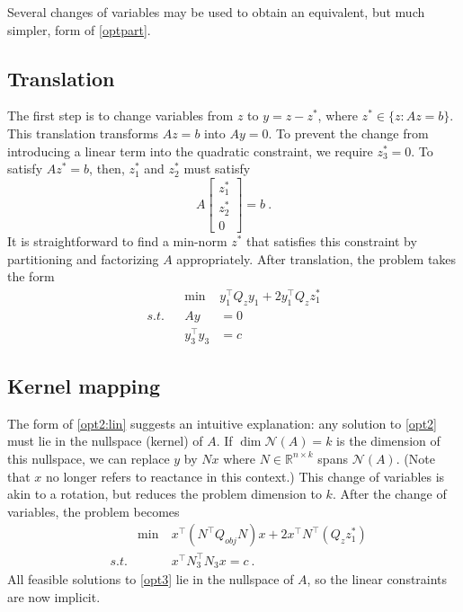 \documentclass[conference]{IEEEtran}
\begin{document}
Several changes of variables may be used to obtain an equivalent, but much simpler, form of \eqref{optpart}.

\subsection{Translation}

The first step is to change variables from $z$ to $y=z-z^*$, where $z^*\in\{z:Az=b\}$. This translation transforms $Az=b$ into $Ay=0$. To prevent the change from introducing a linear term into the quadratic constraint, we require $z_3^*=0$. To satisfy $Az^*=b$, then, $z_1^*$ and $z_2^*$ must satisfy $$ A\begin{bmatrix} z_1^* \\ z_2^* \\ 0 \end{bmatrix} = b ~.$$ It is straightforward to find a min-norm $z^*$ that satisfies this constraint by partitioning and factorizing $A$ appropriately. After translation, the problem takes the form
\begin{subequations}\label{opt2}
\begin{align}
\label{opt2:obj} && \min~ & y_1^\top Q_z y_1 + 2 y_1^\top Q_z z_1^* \\
\label{opt2:lin} s.t. && Ay &= 0 \\
\label{opt2:quad} && y_3^\top y_3 &= c
\end{align}
\end{subequations}

\subsection{Kernel mapping}

The form of \eqref{opt2:lin} suggests an intuitive explanation: any solution to \eqref{opt2} must lie in the nullspace (kernel) of $A$. If $\dim \mathcal{N}(A) =k$ is the dimension of this nullspace, we can replace $y$ by $Nx$ where $N\in\mathbb{R}^{n\times k}$ spans $\mathcal{N}(A)$. (Note that $x$ no longer refers to reactance in this context.) This change of variables is akin to a rotation, but reduces the problem dimension to $k$. After the change of variables, the problem becomes
\begin{subequations}\label{opt3}
\begin{align}
\label{opt3:obj} && \min~ & x^\top (N^\top Q_{obj}N) x + 2x^\top N^\top(Q_zz_1^*) \\
\label{opt3:quad} & s.t. && x^\top N_3^\top N_3 x = c~.
\end{align}
\end{subequations}
All feasible solutions to \eqref{opt3} lie in the nullspace of $A$, so the linear constraints are now implicit.
\end{document}
